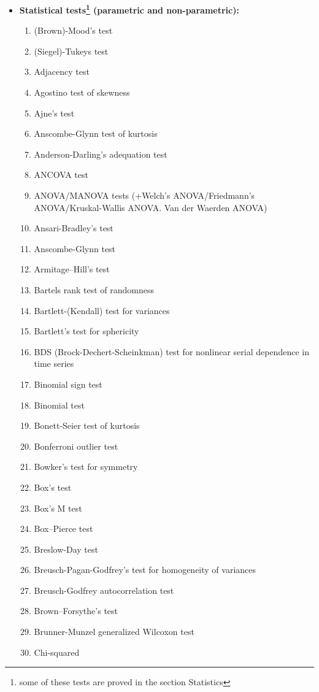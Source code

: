 \begin{itemize}
		\item \textbf{Statistical tests\footnote{some of these tests are proved in the section Statistics} (parametric and non-parametric):}
		\begin{multicols}{3}
		\begin{enumerate}
			\item (Brown)-Mood's test
			\item (Siegel)-Tukeys test
			\item Adjacency test
			\item Agostino test of skewness
			\item Ajne's test
			\item Anscombe-Glynn test of kurtosis
			\item Anderson-Darling's adequation test
			\item ANCOVA test
			\item ANOVA/MANOVA tests (+Welch's ANOVA/Friedmann's ANOVA/Kruskal-Wallis ANOVA. Van der Waerden ANOVA)
			\item Ansari-Bradley's test
			\item Anscombe-Glynn test
			\item Armitage–Hill's test
			\item Bartels rank test of randomness
			\item Bartlett-(Kendall) test for variances
			\item Bartlett's test for sphericity
			\item BDS (Brock-Dechert-Scheinkman) test for nonlinear serial dependence in time series
			\item Binomial sign test
			\item Binomial test 
			\item Bonett-Seier test of kurtosis
			\item Bonferroni outlier test
			\item Bowker's test for symmetry
			\item Box's test
			\item Box's M test
			\item Box–Pierce test
			\item Breslow-Day test
			\item Breusch-Pagan-Godfrey's test for homogeneity of variances
			\item Breusch-Godfrey autocorrelation test
			\item Brown–Forsythe's test
			\item Brunner-Munzel generalized Wilcoxon test
			\item Chi-squared

\end{enumerate}
\end{multicols}
\end{itemize}
